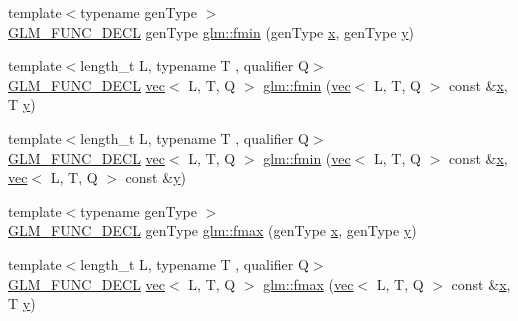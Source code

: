 \begin{DoxyCompactItemize}
\item 
{\footnotesize template$<$typename gen\+Type $>$ }\\\hyperlink{setup_8hpp_ab2d052de21a70539923e9bcbf6e83a51}{G\+L\+M\+\_\+\+F\+U\+N\+C\+\_\+\+D\+E\+CL} gen\+Type \hyperlink{group__gtx__extended__min__max_gaa3200559611ac5b9b9ae7283547916a7}{glm\+::fmin} (gen\+Type \hyperlink{_s_d_l__opengl_8h_ad0e63d0edcdbd3d79554076bf309fd47}{x}, gen\+Type \hyperlink{_s_d_l__opengl_8h_a1675d9d7bb68e1657ff028643b4037e3}{y})
\item 
{\footnotesize template$<$length\+\_\+t L, typename T , qualifier Q$>$ }\\\hyperlink{setup_8hpp_ab2d052de21a70539923e9bcbf6e83a51}{G\+L\+M\+\_\+\+F\+U\+N\+C\+\_\+\+D\+E\+CL} \hyperlink{structglm_1_1vec}{vec}$<$ L, T, Q $>$ \hyperlink{group__gtx__extended__min__max_gae989203363cff9eab5093630df4fe071}{glm\+::fmin} (\hyperlink{structglm_1_1vec}{vec}$<$ L, T, Q $>$ const \&\hyperlink{_s_d_l__opengl_8h_ad0e63d0edcdbd3d79554076bf309fd47}{x}, T \hyperlink{_s_d_l__opengl_8h_a1675d9d7bb68e1657ff028643b4037e3}{y})
\item 
{\footnotesize template$<$length\+\_\+t L, typename T , qualifier Q$>$ }\\\hyperlink{setup_8hpp_ab2d052de21a70539923e9bcbf6e83a51}{G\+L\+M\+\_\+\+F\+U\+N\+C\+\_\+\+D\+E\+CL} \hyperlink{structglm_1_1vec}{vec}$<$ L, T, Q $>$ \hyperlink{group__gtx__extended__min__max_ga7c42e93cd778c9181d1cdeea4d3e43bd}{glm\+::fmin} (\hyperlink{structglm_1_1vec}{vec}$<$ L, T, Q $>$ const \&\hyperlink{_s_d_l__opengl_8h_ad0e63d0edcdbd3d79554076bf309fd47}{x}, \hyperlink{structglm_1_1vec}{vec}$<$ L, T, Q $>$ const \&\hyperlink{_s_d_l__opengl_8h_a1675d9d7bb68e1657ff028643b4037e3}{y})
\item 
{\footnotesize template$<$typename gen\+Type $>$ }\\\hyperlink{setup_8hpp_ab2d052de21a70539923e9bcbf6e83a51}{G\+L\+M\+\_\+\+F\+U\+N\+C\+\_\+\+D\+E\+CL} gen\+Type \hyperlink{group__gtx__extended__min__max_gae5792cb2b51190057e4aea027eb56f81}{glm\+::fmax} (gen\+Type \hyperlink{_s_d_l__opengl_8h_ad0e63d0edcdbd3d79554076bf309fd47}{x}, gen\+Type \hyperlink{_s_d_l__opengl_8h_a1675d9d7bb68e1657ff028643b4037e3}{y})
\item 
{\footnotesize template$<$length\+\_\+t L, typename T , qualifier Q$>$ }\\\hyperlink{setup_8hpp_ab2d052de21a70539923e9bcbf6e83a51}{G\+L\+M\+\_\+\+F\+U\+N\+C\+\_\+\+D\+E\+CL} \hyperlink{structglm_1_1vec}{vec}$<$ L, T, Q $>$ \hyperlink{group__gtx__extended__min__max_gab380df808a15a6a23993e3475d1b94d2}{glm\+::fmax} (\hyperlink{structglm_1_1vec}{vec}$<$ L, T, Q $>$ const \&\hyperlink{_s_d_l__opengl_8h_ad0e63d0edcdbd3d79554076bf309fd47}{x}, T \hyperlink{_s_d_l__opengl_8h_a1675d9d7bb68e1657ff028643b4037e3}{y})

\end{DoxyCompactItemize}
